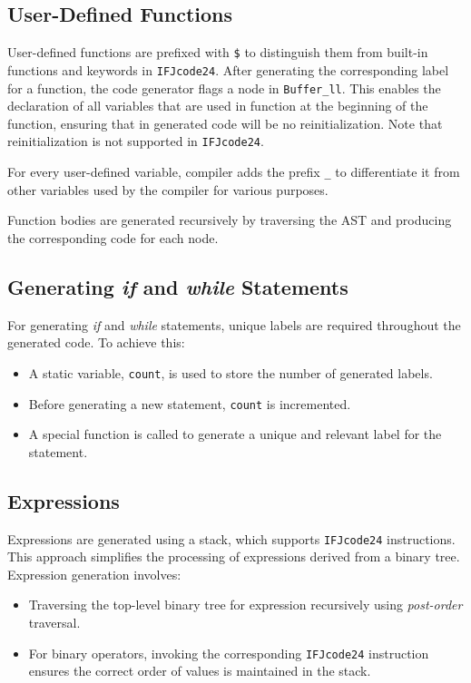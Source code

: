 \documentclass[a4paper, 11pt]{article}
\begin{document}
\subsection{User-Defined Functions}

User-defined functions are prefixed with \verb|$| to distinguish them from built-in functions and keywords in \verb|IFJcode24|. After generating the corresponding label for a function, the code generator flags a node in \verb|Buffer_ll|. This enables the declaration of all variables that are used in function at the beginning of the function, ensuring that in generated code will be no reinitialization. Note that reinitialization is not supported in \verb|IFJcode24|. 

For every user-defined variable, compiler adds the prefix \verb|_| to differentiate it from other variables used by the compiler for various purposes.

Function bodies are generated recursively by traversing the \textsc{AST} and producing the corresponding code for each node.

\subsection{Generating \textit{if} and \textit{while} Statements}

For generating \textit{if} and \textit{while} statements, unique labels are required throughout the generated code. To achieve this:
\begin{itemize}
    \item A static variable, \verb|count|, is used to store the number of generated labels.
    \item Before generating a new statement, \verb|count| is incremented.
    \item A special function is called to generate a unique and relevant label for the statement.
\end{itemize}

\subsection{Expressions}

Expressions are generated using a stack, which supports \verb|IFJcode24| instructions. This approach simplifies the processing of expressions derived from a binary tree. Expression generation involves:
\begin{itemize}
    \item Traversing the top-level binary tree for expression recursively using \textit{post-order} traversal.
    \item For binary operators, invoking the corresponding \verb|IFJcode24| instruction ensures the correct order of values is maintained in the stack.
\end{itemize}
\end{document}
